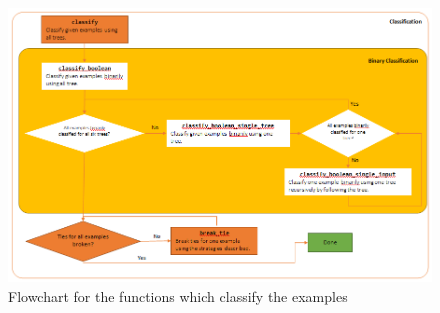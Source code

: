 \documentclass[a4paper]{article}
\begin{document}
\begin{figure}[H]
\center
\includegraphics[width=0.9\columnwidth]{flowchartClassify}
\caption{Flowchart for the functions which classify the examples}
\label{flowchartClassify}
\end{figure}

\clearpage

\end{document}
